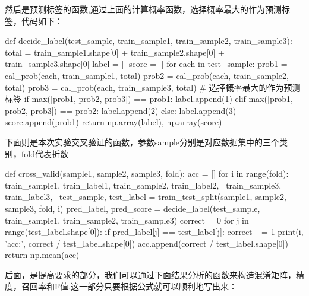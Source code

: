 \documentclass[UTF8,a4paper,10pt]{ctexart}
\begin{document}
然后是预测标签的函数,通过上面的计算概率函数，选择概率最大的作为预测标签，代码如下：

\begin{python}
    def decide_label(test_sample, train_sample1, train_sample2, train_sample3):
    total = train_sample1.shape[0] + train_sample2.shape[0] + train_sample3.shape[0]
    label = []
    score = []
    for each in test_sample:
        prob1 = cal_prob(each, train_sample1, total)
        prob2 = cal_prob(each, train_sample2, total)
        prob3 = cal_prob(each, train_sample3, total)
        # 选择概率最大的作为预测标签
        if max([prob1, prob2, prob3]) == prob1:
            label.append(1)
        elif max([prob1, prob2, prob3]) == prob2:
            label.append(2)
        else:
            label.append(3)
        score.append(prob1)
    return np.array(label), np.array(score)

\end{python}

下面则是本次实验交叉验证的函数，参数sample分别是对应数据集中的三个类别，fold代表折数

\begin{python}
def cross_valid(sample1, sample2, sample3, fold):
    acc = []
    for i in range(fold):
        train_sample1, train_label1, train_sample2, train_label2, \
        train_sample3, train_label3, \
        test_sample, test_label = train_test_split(sample1, sample2, sample3, fold, i)
        pred_label, pred_score = decide_label(test_sample, train_sample1, train_sample2, train_sample3)
        correct = 0
        for j in range(test_label.shape[0]):
            if pred_label[j] == test_label[j]:
                correct += 1
        print(i, 'acc:', correct / test_label.shape[0])
        acc.append(correct / test_label.shape[0])
    return np.mean(acc)
\end{python}

后面，是提高要求的部分，我们可以通过下面结果分析的函数来构造混淆矩阵，精度，召回率和F值,这一部分只要根据公式就可以顺利地写出来：
\end{document}
